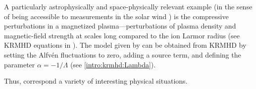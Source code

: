 A particularly astrophysically and space-physically relevant example 
(in the sense of being accessible to measurements in the solar wind 
\cite{celnikier83,celnikier87,marsch90,bershadskii04,hnat05,chen11}) is 
the compressive perturbations in a magnetized plasma---perturbations 
of plasma density and magnetic-field strength at scales long compared 
to the ion Larmor radius (see KRMHD equations in ). The model
given by  can be obtained from KRMHD by setting the
Alfv\'{e}n fluctuations to zero, adding a source term, and defining the parameter $\alpha = -1/\Lambda$ (see
\eqref{intro:krmhd:Lambda}).

%
Thus,  correspond a variety of interesting physical situations. 

